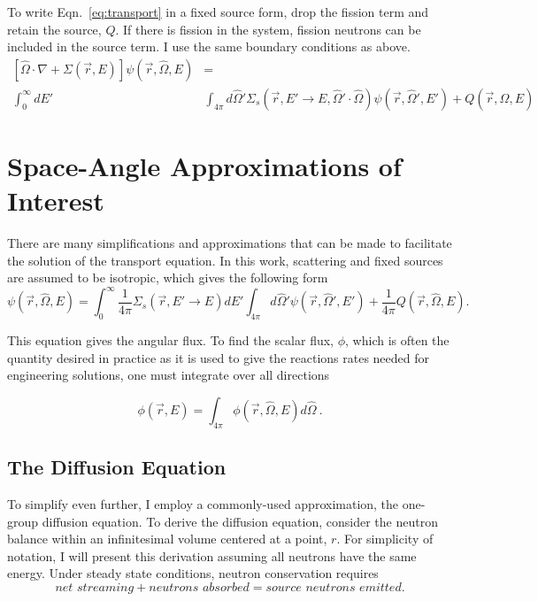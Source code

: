 To write Eqn.~\eqref{eq:transport} in a fixed source form, drop the fission term and retain the source, $Q$. If there is fission in the system, fission neutrons can be included in the source term. I use the same boundary conditions as above. 
%
\begin{equation}
\begin{split}
 [\hat{\Omega} \cdot \nabla + \Sigma(\vec{r}, E)]\psi(\vec{r}, \hat{\Omega}, E) &= \\ \int_0^\infty dE' &\int_{4\pi} d\hat{\Omega}' \Sigma_s(\vec{r}, E' \rightarrow E, \hat{\Omega}' \cdot \hat{\Omega})\psi(\vec{r}, \hat{\Omega}', E')  + Q(\vec{r}, \hat{\Omega}, E)
\end{split}
 \label{eq:transport_fixed_source}
\end{equation}



\section{Space-Angle Approximations of Interest}
There are many simplifications and approximations that can be made to facilitate the solution of the transport equation. In this work, scattering and fixed sources are assumed to be isotropic, which gives the following form
%
\begin{equation}
[\hat{\Omega} \cdot \nabla + \Sigma_t(\vec{r}, E)] \psi(\vec{r}, \hat{\Omega}, E) =   \int_0^\infty \frac{1}{4\pi} \Sigma_s(\vec{r}, E' \rightarrow E)  dE' \int_{4\pi} d\hat{\Omega}'\psi(\vec{r}, \hat{\Omega}', E')  + \frac{1}{4\pi}Q(\vec{r}, \hat{\Omega}, E) .
 \label{eq:transport_isotropic_scattering}
\end{equation}

This equation gives the angular flux. To find the scalar flux, $\phi$, which is often the quantity desired in practice as it is used to give the reactions rates needed for engineering solutions, one must integrate over all directions

\begin{equation}
  \phi(\vec{r}, E) = \int_{4\pi} \phi(\vec{r}, \hat{\Omega}, E) d \hat{\Omega}\:.
\end{equation}


\subsection{The Diffusion Equation}
To simplify even further, I employ a commonly-used approximation, the one-group diffusion equation. To derive the diffusion equation, consider the neutron balance within an infinitesimal volume centered at a point, $r$. For simplicity of notation, I will present this derivation assuming all neutrons have the same energy. Under steady state conditions, neutron conservation requires
%
\begin{equation}
    \textit{net streaming} + \textit{neutrons absorbed} = \textit{source neutrons emitted}.
\end{equation}

